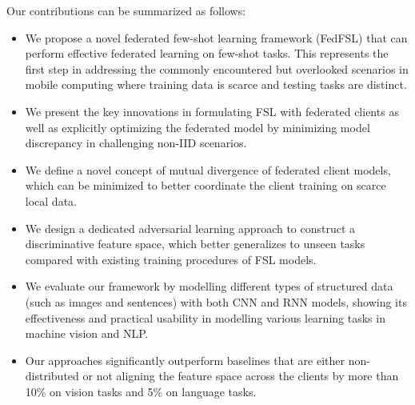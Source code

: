Our contributions can be summarized as follows:
\begin{itemize}[leftmargin=*]
    \item We propose a novel federated few-shot learning framework (FedFSL) that can perform effective federated learning on few-shot tasks. This represents the first step in addressing the commonly encountered but overlooked scenarios in mobile computing where training data is scarce and testing tasks are distinct.
    \item We present the key innovations in formulating FSL with federated clients as well as explicitly optimizing the federated model by minimizing model discrepancy in challenging non-IID scenarios.
    \item We define a novel concept of mutual divergence of federated client models, which can be minimized to better coordinate the client training on scarce local data. 
    \item We design a dedicated adversarial learning approach to construct a discriminative feature space, which better generalizes to unseen tasks compared with existing training procedures of FSL models. 
     \item We evaluate our framework by modelling different types of structured data (such as images and sentences) with both CNN and RNN models, showing its effectiveness and practical usability in modelling various learning tasks in machine vision and NLP.
    \item Our approaches significantly outperform baselines that are either non-distributed or not aligning the feature space across the clients by more than 10\% on vision tasks and 5\% on language tasks.
\end{itemize}








